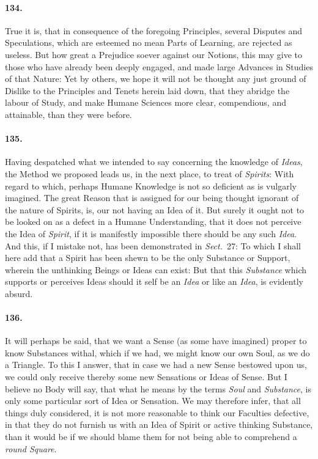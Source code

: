 \documentclass[]{article}
\newenvironment{sectionbody}{\begin{multicols}{2}}{\end{multicols}}
\begin{document}
\begin{sectionbody}
\paragraph{134.} True it is, that in consequence of the foregoing Principles,
several Disputes and Speculations, which are esteemed no mean
Parts of Learning, are rejected as useless.  But how great a
Prejudice soever against our Notions, this may give to those who
have already been deeply engaged, and made large Advances in
Studies of that Nature: Yet by others, we hope it will not be
thought any just ground of Dislike to the Principles and Tenets
herein laid down, that they abridge the labour of Study, and make
Humane Sciences more clear, compendious, and attainable, than
they were before.



\paragraph{135.} Having despatched what we intended to say concerning the
knowledge of \emph{Ideas}, the Method we proposed leads us, in the
next place, to treat of \emph{Spirits}: With regard to which,
perhaps Humane Knowledge is not so deficient as is vulgarly
imagined.  The great Reason that is assigned for our being
thought ignorant of the nature of Spirits, is, our not having an
Idea of it.  But surely it ought not to be looked on as a defect
in a Humane Understanding, that it does not perceive the Idea of
\emph{Spirit}, if it is manifestly impossible there should be any
such \emph{Idea}.  And this, if I mistake not, has been
demonstrated in \emph{Sect.}~27: To which I shall here add that a
Spirit has been shewn to be the only Substance or Support,
wherein the unthinking Beings or Ideas can exist: But that this
\emph{Substance} which supports or perceives Ideas should it
self be an \emph{Idea} or like an \emph{Idea}, is evidently
absurd.



\paragraph{136.} It will perhaps be said, that we want a Sense (as some have
imagined) proper to know Substances withal, which if we had, we
might know our own Soul, as we do a Triangle.  To this I answer,
that in case we had a new Sense bestowed upon us, we could only
receive thereby some new Sensations or Ideas of Sense.  But I
believe no Body will say, that what he means by the terms
\emph{Soul} and \emph{Substance}, is only some particular sort of
Idea or Sensation.  We may therefore infer, that all things duly
considered, it is not more reasonable to think our Faculties
defective, in that they do not furnish us with an Idea of Spirit
or active thinking Substance, than it would be if we should blame
them for not being able to comprehend a \emph{round Square}.




\end{sectionbody}
\end{document}
